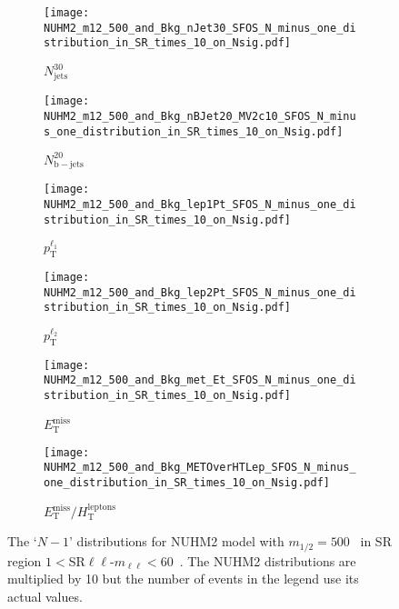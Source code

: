 \begin{figure}[htbp]
    \begin{center}
        \begin{subfigure}[b]{0.48\textwidth}
            \texttt{[image: NUHM2\_m12\_500\_and\_Bkg\_nJet30\_SFOS\_N\_minus\_one\_distribution\_in\_SR\_times\_10\_on\_Nsig.pdf]}
            \caption{$N^{30}_{\mathrm{jets}}$}
            \label{fig:event_nuhm2_m12_500_nJet30_SFOS}
        \end{subfigure}
        \begin{subfigure}[b]{0.48\textwidth}
            \texttt{[image: NUHM2\_m12\_500\_and\_Bkg\_nBJet20\_MV2c10\_SFOS\_N\_minus\_one\_distribution\_in\_SR\_times\_10\_on\_Nsig.pdf]}
            \caption{$N^{20}_{\mathrm{b-jets}}$}
            \label{fig:event_nuhm2_m12_500_nBJet20_SFOS}
        \end{subfigure}
        \begin{subfigure}[b]{0.48\textwidth}
            \texttt{[image: NUHM2\_m12\_500\_and\_Bkg\_lep1Pt\_SFOS\_N\_minus\_one\_distribution\_in\_SR\_times\_10\_on\_Nsig.pdf]}
            \caption{$p^{\ell_1}_{\mathrm{T}}$}
            \label{fig:event_nuhm2_m12_500_lep1Pt_SFOS}
        \end{subfigure}
        \begin{subfigure}[b]{0.48\textwidth}
            \texttt{[image: NUHM2\_m12\_500\_and\_Bkg\_lep2Pt\_SFOS\_N\_minus\_one\_distribution\_in\_SR\_times\_10\_on\_Nsig.pdf]}
            \caption{$p^{\ell_2}_{\mathrm{T}}$}
            \label{fig:event_nuhm2_m12_500_lep2Pt_SFOS}
        \end{subfigure}
        \begin{subfigure}[b]{0.48\textwidth}
            \texttt{[image: NUHM2\_m12\_500\_and\_Bkg\_met\_Et\_SFOS\_N\_minus\_one\_distribution\_in\_SR\_times\_10\_on\_Nsig.pdf]}
            \caption{$E^{\mathrm{miss}}_{\mathrm{T}}$}
            \label{fig:event_nuhm2_m12_500_met_SFOS}
        \end{subfigure}
        \begin{subfigure}[b]{0.48\textwidth}
            \texttt{[image: NUHM2\_m12\_500\_and\_Bkg\_METOverHTLep\_SFOS\_N\_minus\_one\_distribution\_in\_SR\_times\_10\_on\_Nsig.pdf]}
            \caption{$E^{\mathrm{miss}}_{\mathrm{T}} / H^{\mathrm{leptons}}_{\mathrm{T}}$}
            \label{fig:event_nuhm2_m12_500_METOverHTLep_SFOS}
        \end{subfigure}
    \end{center}
    \caption{The `$N-1$' distributions for NUHM2 model with $m_{1/2} = 500$~{\GeV} in SR region $1 < $SR$\ell \ell$-$m_{\ell \ell} < 60$~{\GeV}.
    The NUHM2 distributions are multiplied by 10 but the number of events in the legend use its actual values.}
    \label{fig:event_nuhm2_kinematic_in_SR_SFOS_1}
\end{figure}

